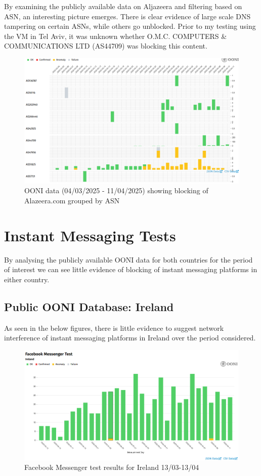 By examining the publicly available data on Aljazeera and filtering based on ASN, an interesting picture emerges. There is clear evidence of large scale DNS tampering on certain ASNs, while others go unblocked. Prior to my testing using the VM in Tel Aviv, it was unknown whether O.M.C. COMPUTERS \& COMMUNICATIONS LTD (AS44709) was blocking this content. 

\begin{figure} [H]
    \centering
    \includegraphics[width=1\linewidth]{ALJZRbyASN.png}
    \caption{OONI data (04/03/2025 - 11/04/2025) showing blocking of Alazeera.com grouped by ASN}
    \label{fig:enter-label}
\end{figure}



\section{Instant Messaging Tests}
By analysing the publicly available OONI data for both countries for the period of interest we can see little evidence of blocking of instant messaging platforms in either country.

\subsection{Public OONI Database: Ireland}
As seen in the below figures, there is little evidence to suggest network interference of instant messaging platforms in Ireland over the period considered.

\begin{figure} [H]
    \centering
    \includegraphics[width=0.5\linewidth]{IREOONIDBIMFB.png}
    \caption{Facebook Messenger test results for Ireland 13/03-13/04}
    \label{fig:enter-label}
\end{figure}

